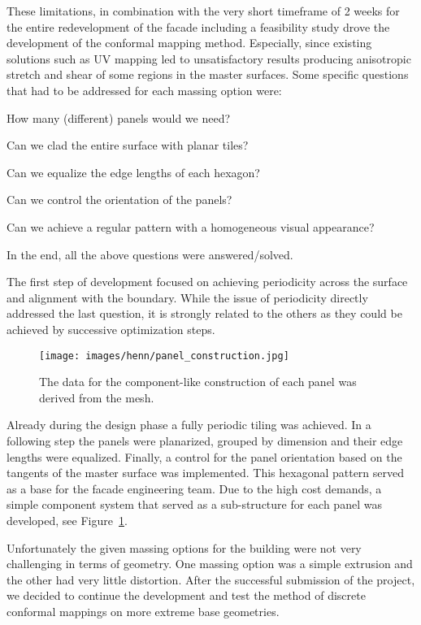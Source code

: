 \documentclass[Thesis.tex]{subfiles}
\begin{document}
These limitations, in combination with the very short timeframe of 2
weeks for the entire redevelopment of the facade including a
feasibility study drove the development of the conformal mapping
method. Especially, since existing solutions such as UV mapping led to
unsatisfactory results producing anisotropic stretch and shear of some
regions in the master surfaces.  Some specific questions that had to
be addressed for each massing option were:
\smallskip
\begin{compactitem}
\item How many (different) panels would we need?
\item Can we clad the entire surface with planar tiles?
\item Can we equalize the edge lengths of each hexagon?
\item Can we control the orientation of the panels?
\item Can we achieve a regular pattern with a homogeneous visual
  appearance?
\end{compactitem}
\smallskip
In the end, all the above questions were answered/solved.

The first step of development focused on achieving periodicity across
the surface and alignment with the boundary. While the issue of
periodicity directly addressed the last question, it is strongly
related to the others as they could be achieved by successive
optimization steps.

\begin{figure}[t]
  \centering
  \texttt{[image: images/henn/panel\_construction.jpg]}
  \caption{The data for the component-like construction of each panel was derived from the mesh.}
  \label{fig:panel_construction}
\end{figure}

Already during the design phase a fully periodic tiling was
achieved. In a following step the panels were planarized, grouped by
dimension and their edge lengths were equalized. Finally, a control
for the panel orientation based on the tangents of the \nurbs master
surface was implemented. This hexagonal pattern served as a base for
the facade engineering team. Due to the high cost demands, a simple
component system that served as a sub-structure for each panel was
developed, see Figure~\ref{fig:panel_construction}.

Unfortunately the given massing options for the building were not very
challenging in terms of geometry. One massing option was a simple
extrusion and the other had very little distortion. After the
successful submission of the project, we decided to continue the
development and test the method of discrete conformal mappings on more
extreme base geometries.
\end{document}
